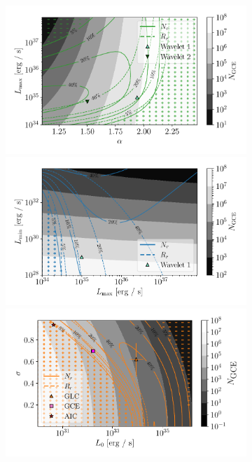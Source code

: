 \documentclass[letter,11pt]{article}
\begin{document}
\begin{figure}
    \centering
    \begin{subfigure}[b]{0.49\textwidth}
     \includegraphics[width=\textwidth]{figs/power-law-alpha-pos-1x.pdf}
        \includegraphics[width=\textwidth]{figs/power-law-pos-1x.pdf}
        \includegraphics[width=\textwidth]{figs/log-normal-pos-1x.pdf}

\end{subfigure}
\end{figure}
\end{document}
